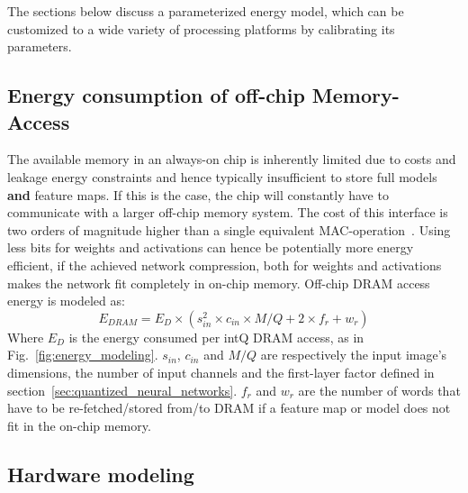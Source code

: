 \documentclass[article,10pt]{IEEEtran}
\begin{document}
The sections below discuss a parameterized energy model, which can be customized to a wide variety of processing platforms by calibrating its parameters.

\subsection{Energy consumption of off-chip Memory-Access}
\label{subsec:energy_consumption_of_on-chip_memory-access}
The available memory in an always-on chip is inherently limited due to costs and leakage energy constraints and hence typically insufficient to store full models \textbf{and} feature maps. If this is the case, the chip will constantly have to communicate with a larger off-chip memory system. The cost of this interface is two orders of magnitude higher than a single equivalent MAC-operation~\cite{Horowitz}. Using less bits for weights and activations can hence be potentially more energy efficient, if the achieved network compression, both for weights and activations makes the network fit completely in on-chip memory. Off-chip DRAM access energy is modeled as:
\begin{equation}
\label{eq:dram}
 E_{DRAM} = E_{D} \times (s_{in}^2 \times c_{in} \times M/Q + 2\times f_{r} + w_{r})
\end{equation}
Where $E_{D}$ is the energy consumed per intQ DRAM access, as in Fig.~\ref{fig:energy_modeling}. $s_{in}$, $c_{in}$ and $M/Q$ are respectively the input image's dimensions, the number of input channels and the first-layer factor defined in section~\ref{sec:quantized_neural_networks}. $f_{r}$ and $w_{r}$ are the number of words that have to be re-fetched/stored from/to DRAM if a feature map or model does not fit in the on-chip memory.


\subsection{Hardware modeling}
\label{subsec:generic_asic_modelling}
\end{document}
